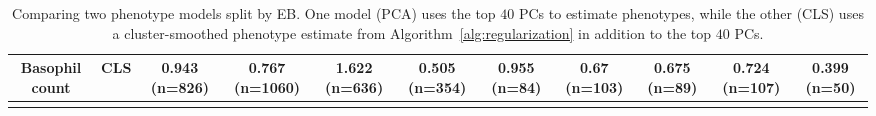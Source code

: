 \begin{landscape}
\begin{table}[!htbp]
\begin{tabular}{ ccccccccccc}
Basophil count & CLS & 0.943 (n=826) & 0.767 (n=1060) & 1.622 (n=636) & 0.505 (n=354) & 0.955 (n=84) & 0.67 (n=103) & 0.675 (n=89) & 0.724 (n=107) & 0.399 (n=50) \\ 
\hline \\[-1.8ex] 
\end{tabular} 
\caption[Comparing phenotype models by EB (2)]{Comparing two phenotype models split by EB. One model (PCA) uses the top $40$ PCs to estimate phenotypes, while the other (CLS) uses a cluster-smoothed phenotype estimate from Algorithm~\ref{alg:regularization} in addition to the top $40$ PCs.}
  \label{table:supp_mse2} 
\end{table} 

\end{landscape}